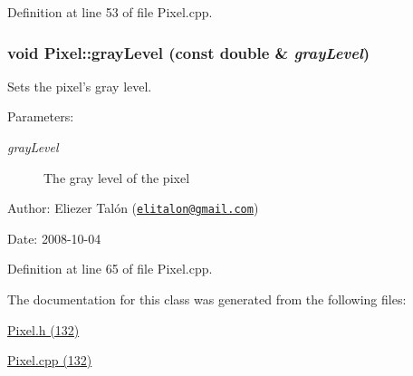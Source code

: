 Definition at line 53 of file Pixel.cpp.\hypertarget{class_pixel_5f287c6a53167076bc8f1ce54e74e38d}{
\subsubsection[grayLevel]{\setlength{\rightskip}{0pt plus 5cm}void Pixel::grayLevel (const double \& {\em grayLevel})}}
\label{class_pixel_5f287c6a53167076bc8f1ce54e74e38d}


Sets the pixel's gray level. 

\begin{Desc}
\item[Parameters:]
\begin{description}
\item[{\em grayLevel}]The gray level of the pixel\end{description}
\end{Desc}
\begin{Desc}
\item[Author:]Eliezer Talón (\href{mailto:elitalon@gmail.com}{\tt elitalon@gmail.com}) \end{Desc}
\begin{Desc}
\item[Date:]2008-10-04 \end{Desc}


Definition at line 65 of file Pixel.cpp.

The documentation for this class was generated from the following files:\begin{CompactItemize}
\item 
\hyperlink{_pixel_8h}{Pixel.h (132)}\item 
\hyperlink{_pixel_8cpp}{Pixel.cpp (132)}\end{CompactItemize}

